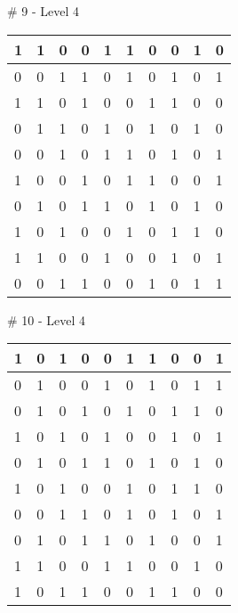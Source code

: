 \smallskip

\# 9 - Level 4 \newline
\begin{tabular}{|m{\collen}|m{\collen}|m{\collen}|m{\collen}|m{\collen}|m{\collen}|m{\collen}|m{\collen}|m{\collen}|m{\collen}|}
\hline
  1 & 1 & 0 & 0 & 1 & 1 & 0 & 0 & 1 & 0 \\
\hline
  0 & 0 & 1 & 1 & 0 & 1 & 0 & 1 & 0 & 1 \\
\hline
  1 & 1 & 0 & 1 & 0 & 0 & 1 & 1 & 0 & 0 \\
\hline
  0 & 1 & 1 & 0 & 1 & 0 & 1 & 0 & 1 & 0 \\
\hline
  0 & 0 & 1 & 0 & 1 & 1 & 0 & 1 & 0 & 1 \\
\hline
  1 & 0 & 0 & 1 & 0 & 1 & 1 & 0 & 0 & 1 \\
\hline
  0 & 1 & 0 & 1 & 1 & 0 & 1 & 0 & 1 & 0 \\
\hline
  1 & 0 & 1 & 0 & 0 & 1 & 0 & 1 & 1 & 0 \\
\hline
  1 & 1 & 0 & 0 & 1 & 0 & 0 & 1 & 0 & 1 \\
\hline
  0 & 0 & 1 & 1 & 0 & 0 & 1 & 0 & 1 & 1 \\
\hline
\end{tabular}


\smallskip

\# 10 - Level 4 \newline
\begin{tabular}{|m{\collen}|m{\collen}|m{\collen}|m{\collen}|m{\collen}|m{\collen}|m{\collen}|m{\collen}|m{\collen}|m{\collen}|}
\hline
  1 & 0 & 1 & 0 & 0 & 1 & 1 & 0 & 0 & 1 \\
\hline
  0 & 1 & 0 & 0 & 1 & 0 & 1 & 0 & 1 & 1 \\
\hline
  0 & 1 & 0 & 1 & 0 & 1 & 0 & 1 & 1 & 0 \\
\hline
  1 & 0 & 1 & 0 & 1 & 0 & 0 & 1 & 0 & 1 \\
\hline
  0 & 1 & 0 & 1 & 1 & 0 & 1 & 0 & 1 & 0 \\
\hline
  1 & 0 & 1 & 0 & 0 & 1 & 0 & 1 & 1 & 0 \\
\hline
  0 & 0 & 1 & 1 & 0 & 1 & 0 & 1 & 0 & 1 \\
\hline
  0 & 1 & 0 & 1 & 1 & 0 & 1 & 0 & 0 & 1 \\
\hline
  1 & 1 & 0 & 0 & 1 & 1 & 0 & 0 & 1 & 0 \\
\hline
  1 & 0 & 1 & 1 & 0 & 0 & 1 & 1 & 0 & 0 \\
\hline
\end{tabular}


\smallskip

